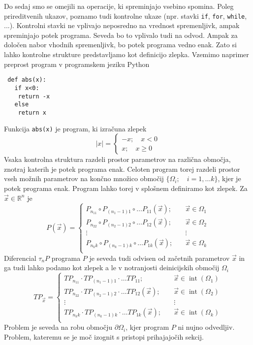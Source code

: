 \documentclass{article}
\newcommand{\RR}{\mathbb{R}}
\newcommand{\sumd}{\tau}
\DeclareMathOperator{\interior}{int}
\begin{document}
 Do sedaj smo se omejili na operacije, ki spreminjajo vsebino spomina. Poleg
 prireditvenih ukazov, poznamo tudi kontrolne ukaze (npr. stavki \texttt{if},
 \texttt{for}, \texttt{while}, ...). Kontrolni stavki ne vplivajo neposredno na
 vrednost spremenljivk, ampak spreminjajo potek programa. Seveda bo to vplivalo
 tudi na odvod. Ampak za določen nabor vhodnih spremenljivk, bo potek programa
 vedno enak. Zato si lahko kontrolne strukture predstavljamo kot definicijo
 zlepka. Vzemimo naprimer preprost program v programskem jeziku Python
 \begin{verbatim}
 def abs(x):
   if x<0:
    return -x
   else
    return x
 \end{verbatim}
 Funkcija \texttt{abs(x)} je program, ki izračuna zlepek
 \begin{equation}
   \label{eq:zlepek}
   |x| =
   \begin{cases}
     -x;\quad x<0\\
     x;\quad x\ge 0
   \end{cases}
 \end{equation}
 Vsaka kontrolna struktura razdeli prostor parametrov na različna območja,
 znotraj katerih je potek programa enak. Celoten program torej razdeli prostor
 vseh možnih parametrov na končno množico območij $\{\Omega_i;\quad i=1,\ldots
 k\}$, kjer je potek programa enak. Program lahko torej v splošnem definiramo kot
 zlepek. Za $\vec{x}\in\RR^n$ je
 \begin{equation}
   \label{eq:zlrprk_splosno}
   P(\vec{x}) =
   \begin{cases}
     P_{n_11}\circ P_{(n_1-1)1}\circ\ldots P_{11}(\vec{x});&\quad \vec{x}\in\Omega_1\\
     P_{n_22}\circ P_{(n_2-1)2}\circ\ldots P_{12}(\vec{x});&\quad \vec{x}\in\Omega_2\\
     \vdots&\quad\vdots\\
     P_{n_kk}\circ P_{(n_k-1)k}\circ\ldots P_{1k}(\vec{x});&\quad \vec{x}\in\Omega_k\\
   \end{cases}
 \end{equation}
 Diferencial $\sumd_nP$ programa $P$ je seveda tudi odvisen od začetnih parametrov
 $\vec{x}$ in ga tudi lahko podamo kot zlepek a le v notranjosti deinicijskih območij $\Omega_i$
 \begin{equation}
   \label{eq:Dzlrprk_splosno}
   TP_{\vec{x}} =
   \begin{cases}
     TP_{n_11}\cdot TP_{(n_1-1)1}\cdot\ldots TP_{11};&\quad \vec{x}\in\interior(\Omega_1)\\
     TP_{n_22}\cdot TP_{(n_2-1)2}\cdot\ldots TP_{12}(\vec{x});&\quad \vec{x}\in\interior(\Omega_2)\\
     \vdots&\quad\vdots\\
     TP_{n_kk}\cdot TP_{(n_k-1)k}\cdot\ldots TP_{1k}(\vec{x});&\quad \vec{x}\in\interior(\Omega_k)\\
   \end{cases}
 \end{equation}
 Problem je seveda na robu območju $\partial\Omega_i$, kjer program $P$ ni nujno odvedljiv. Problem, kateremu se je moč izognit s pristopi prihajajočih sekcij.
 
\end{document}

